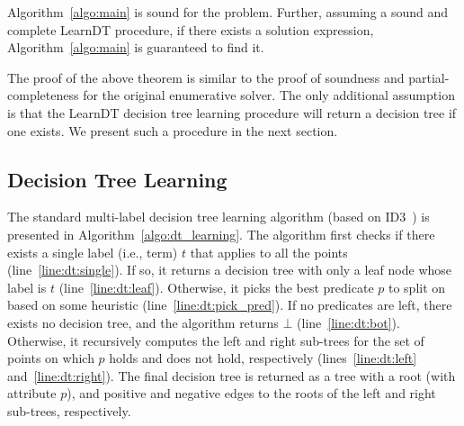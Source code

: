 \documentclass{llncs}
\newcommand\Pred{p}
\newcommand\Term{t}
\newcommand{\sygus}{{\sffamily\fontsize{8.5}{10}\selectfont
    SyGuS}\xspace}
\begin{document}
\begin{theorem}
\vspace*{-1mm}
  Algorithm~\ref{algo:main} is sound for the {\upshape\sygus} problem.
  Further, assuming a sound and complete {\sc LearnDT} procedure, if
  there exists a solution expression, Algorithm~\ref{algo:main} is
  guaranteed to find it.
\vspace*{-1mm}
\end{theorem}
The proof of the above theorem is similar to the proof of soundness and
partial-completeness for the original enumerative solver.
The only additional assumption is that the {\sc LearnDT} decision tree
learning procedure will return a decision tree if one exists.
We present such a procedure in the next section.


\vspace*{-1ex}
\subsection{Decision Tree Learning}
\label{sec:decision_trees}
\vspace*{-1ex}

The standard multi-label decision tree learning algorithm (based on
ID3~\cite{quinlan-86}) is presented in Algorithm~\ref{algo:dt_learning}.
The algorithm first checks if there exists a single label (i.e., term)
$\Term$ that applies to all the points (line~\ref{line:dt:single}).
If so, it returns a decision tree with only a leaf node whose label is
$\Term$ (line~\ref{line:dt:leaf}).
Otherwise, it picks the best predicate $\Pred$ to split on based on some
heuristic (line~\ref{line:dt:pick_pred}).
If no predicates are left, there exists no decision tree, and the
algorithm returns $\bot$ (line~\ref{line:dt:bot}).
Otherwise, it recursively computes the left and right sub-trees for the set of
points on which $\Pred$ holds and does not hold, respectively
(lines~\ref{line:dt:left} and~\ref{line:dt:right}).
The final decision tree is returned as a tree with a root (with
attribute $\Pred$), and positive and negative edges to the roots of the
left and right sub-trees, respectively.
\end{document}
